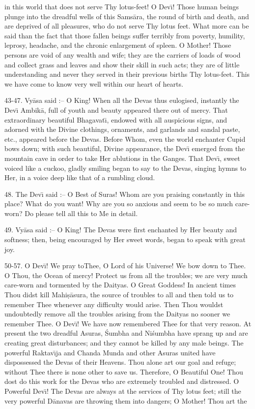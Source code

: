 in this world that does not serve Thy lotus-feet! O Dev\={\i}! Those human beings plunge into the dreadful wells of this Sams\=ara, the round of birth and death, and are deprived of all pleasures, who do not serve Thy lotus feet. What more can be said than the fact that those fallen beings suffer terribly from poverty, humility, leprosy, headache, and the chronic enlargement of spleen. O Mother! Those persons are void of any wealth and wife; they are the carriers of loads of wood and collect grass and leaves and show their skill in such acts; they are of little understanding and never they served in their previous births Thy lotus-feet. This we have come to know very well within our heart of hearts.

43-47. Vy\=asa said :-- O King! When all the Devas thus eulogised, instantly the Dev\={\i} Ambik\=a, full of youth and beauty appeared there out of mercy. That extraordinary beautiful Bhagavat\={\i}, endowed with all auspicious signs, and adorned with the Divine clothings, ornaments, and garlands and sandal paste, etc., appeared before the Devas. Before Whom, even the world enchanter Cupid bows down; with such beautiful, Divine appearance, the Dev\={\i} emerged from the mountain cave in order to take Her ablutions in the Ganges. That Dev\={\i}, sweet voiced like a cuckoo, gladly smiling began to say to the Devas, singing hymns to Her, in a voice deep like that of a rumbling cloud.

48. The Dev\={\i} said :-- O Best of Suras! Whom are you praising constantly in this place? What do you want! Why are you so anxious and seem to be so much care-worn? Do please tell all this to Me in detail.

49. Vy\=asa said :-- O King! The Devas were first enchanted by Her beauty and softness; then, being encouraged by Her sweet words, began to speak with great joy.

50-57. O Dev\={\i}! We pray toThee, O Lord of his Universe! We bow down to Thee. O Thou, the Ocean of mercy! Protect us from all the troubles; we are very much care-worn and tormented by the Daityas. O Great Goddess! In ancient times Thou didst kill Mahi\d{s}\=asura, the source of troubles to all and then told us to remember Thee whenever any difficulty would arise. Then Thou wouldst undoubtedly remove all the troubles arising from the Daityas no sooner we remember Thee. O Dev\={\i}! We have now remembered Thee for that very reason. At present the two dreadful Asuras, \'Sumbha and Ni\'sumbha have sprang up and are creating great disturbances; and they cannot be killed by any male beings. The powerful Raktav\={\i}ja and Chanda Munda and other Asuras united have dispossessed the Devas of their Heavens. Thou alone art our goal and refuge; without Thee there is none other to save us. Therefore, O Beautiful One! Thou dost do this work for the Devas who are extremely troubled and distressed. O Powerful Dev\={\i}! The Devas are always at the services of Thy lotus feet; still the very powerful D\=anavas are throwing them into dangers; O Mother! Thou art the

